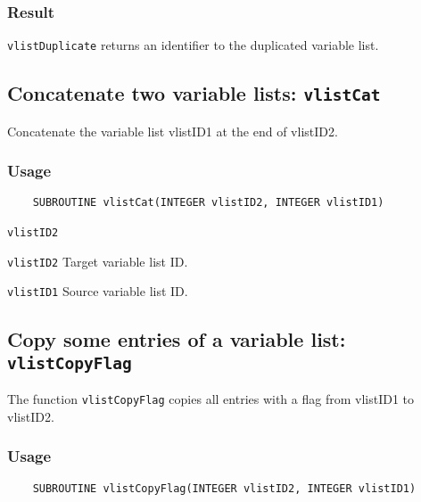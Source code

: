 \subsubsection*{Result}

{\texttt{vlistDuplicate}} returns an identifier to the duplicated variable list.



\subsection{Concatenate two variable lists: \texttt{vlistCat}}
\label{vlistCat}

Concatenate the variable list vlistID1 at the end of vlistID2.

\subsubsection*{Usage}

\begin{verbatim}
    SUBROUTINE vlistCat(INTEGER vlistID2, INTEGER vlistID1)
\end{verbatim}

\hspace*{4mm}\begin{minipage}[]{15cm}
\begin{deflist}{\texttt{vlistID2}\ }
\item[\texttt{vlistID2}]
Target variable list ID.
\item[\texttt{vlistID1}]
Source variable list ID.

\end{deflist}
\end{minipage}


\subsection{Copy some entries of a variable list: \texttt{vlistCopyFlag}}
\label{vlistCopyFlag}

The function {\texttt{vlistCopyFlag}} copies all entries with a flag from vlistID1 to vlistID2.

\subsubsection*{Usage}

\begin{verbatim}
    SUBROUTINE vlistCopyFlag(INTEGER vlistID2, INTEGER vlistID1)
\end{verbatim}

